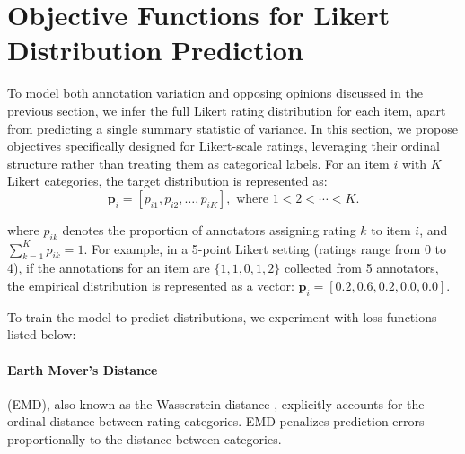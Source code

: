 \documentclass{article} %
\begin{document}
\section{Objective Functions for Likert Distribution Prediction \hspace{35pt}}\label{loss functions}

To model both annotation variation and opposing opinions discussed in the previous section, we infer the full Likert rating distribution for each item, apart from predicting a single summary statistic of variance. In this section, we propose objectives specifically designed for Likert-scale ratings, leveraging their ordinal structure rather than treating them as categorical labels.
For an item \(i\) with \(K\) Likert categories, the target distribution
is represented as:
\begin{equation}
\mathbf{p}_i = [p_{i1}, p_{i2}, \dots, p_{iK}], \text{ where } 1 < 2 < \cdots < K.
\end{equation}

\noindent where \(p_{ik}\) denotes the proportion of annotators assigning rating
\(k\) to item \(i\), and
\(\sum_{k=1}^{K} p_{ik} = 1\).
For example, in a 5-point Likert setting (ratings range from 0 to 4), if the annotations for an item are \(\{1, 1, 0, 1, 2\}\) collected from 5 annotators, the empirical distribution is represented as a vector: \(\mathbf{p}_i = [0.2, 0.6, 0.2, 0.0, 0.0].\)

\vspace{8pt}

\noindent To train the model to predict distributions, we experiment with loss functions listed below:

\paragraph{Earth Mover's Distance} (EMD), also known as the Wasserstein distance \citep{rubner2000earth}, explicitly accounts for the ordinal distance between rating categories.
EMD penalizes prediction errors proportionally to the distance between categories.
\end{document}
